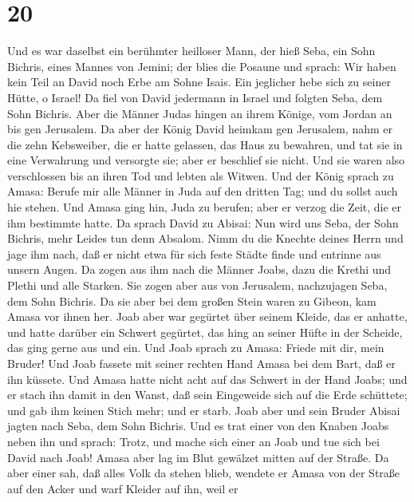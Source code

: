 \hypertarget{section-19}{%
\section{20}\label{section-19}}

 Und es war daselbst ein berühmter heilloser Mann, der hieß
Seba, ein Sohn Bichris, eines Mannes von Jemini; der blies die Posaune
und sprach: Wir haben kein Teil an David noch Erbe am Sohne Isais. Ein
jeglicher hebe sich zu seiner Hütte, o Israel!  Da fiel von
David jedermann in Israel und folgten Seba, dem Sohn Bichris. Aber die
Männer Judas hingen an ihrem Könige, vom Jordan an bis gen Jerusalem.
 Da aber der König David heimkam gen Jerusalem, nahm er die
zehn Kebsweiber, die er hatte gelassen, das Haus zu bewahren, und tat
sie in eine Verwahrung und versorgte sie; aber er beschlief sie nicht.
Und sie waren also verschlossen bis an ihren Tod und lebten als Witwen.
 Und der König sprach zu Amasa: Berufe mir alle Männer in
Juda auf den dritten Tag; und du sollst auch hie stehen. 
Und Amasa ging hin, Juda zu berufen; aber er verzog die Zeit, die er ihm
bestimmte hatte.  Da sprach David zu Abisai: Nun wird uns
Seba, der Sohn Bichris, mehr Leides tun denn Absalom. Nimm du die
Knechte deines Herrn und jage ihm nach, daß er nicht etwa für sich feste
Städte finde und entrinne aus unsern Augen.  Da zogen aus
ihm nach die Männer Joabs, dazu die Krethi und Plethi und alle Starken.
Sie zogen aber aus von Jerusalem, nachzujagen Seba, dem Sohn Bichris.
 Da sie aber bei dem großen Stein waren zu Gibeon, kam Amasa
vor ihnen her. Joab aber war gegürtet über seinem Kleide, das er
anhatte, und hatte darüber ein Schwert gegürtet, das hing an seiner
Hüfte in der Scheide, das ging gerne aus und ein.  Und Joab
sprach zu Amasa: Friede mit dir, mein Bruder! Und Joab fassete mit
seiner rechten Hand Amasa bei dem Bart, daß er ihn küssete.
 Und Amasa hatte nicht acht auf das Schwert in der Hand
Joabs; und er stach ihn damit in den Wanst, daß sein Eingeweide sich auf
die Erde schüttete; und gab ihm keinen Stich mehr; und er starb. Joab
aber und sein Bruder Abisai jagten nach Seba, dem Sohn Bichris.
 Und es trat einer von den Knaben Joabs neben ihn und
sprach: Trotz, und mache sich einer an Joab und tue sich bei David nach
Joab!  Amasa aber lag im Blut gewälzet mitten auf der
Straße. Da aber einer sah, daß alles Volk da stehen blieb, wendete er
Amasa von der Straße auf den Acker und warf Kleider auf ihn, weil er
